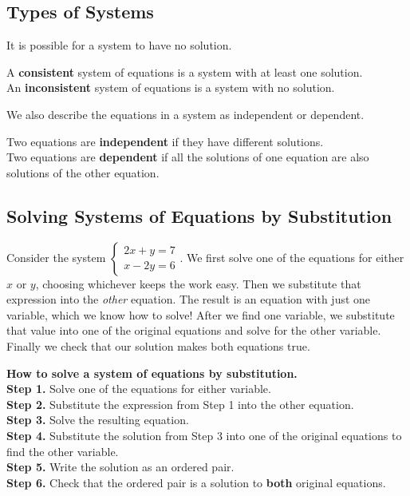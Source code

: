 \documentclass[letter]{article}
\newenvironment{keybox}
  {\begin{lrbox}{\keyboxsave}\begin{minipage}{\dimexpr\linewidth-2\fboxsep-2\fboxrule\relax}}
  {\end{minipage}\end{lrbox}\par\noindent\fbox{\usebox{\keyboxsave}}\par}
\begin{document}
\subsection{Types of Systems}

It is possible for a system to have no solution.

\begin{keybox}
A \textbf{consistent} system of equations is a system with at least one solution.\\
An \textbf{inconsistent} system of equations is a system with no solution.
\end{keybox}

We also describe the equations in a system as independent or dependent.

\begin{keybox}
Two equations are \textbf{independent} if they have different solutions.\\
Two equations are \textbf{dependent} if all the solutions of one equation are also solutions of the other equation.
\end{keybox}

\subsection{Solving Systems of Equations by Substitution}

Consider the system $\begin{cases}2x+y=7\\x-2y=6\end{cases}$. We first solve one of the equations for either $x$ or $y$, choosing whichever keeps the work easy. Then we substitute that expression into the \emph{other} equation. The result is an equation with just one variable, which we know how to solve! After we find one variable, we substitute that value into one of the original equations and solve for the other variable. Finally we check that our solution makes both equations true.

\begin{keybox}
\textbf{How to solve a system of equations by substitution.}\\
\textbf{Step 1.} Solve one of the equations for either variable.\\
\textbf{Step 2.} Substitute the expression from Step 1 into the other equation.\\
\textbf{Step 3.} Solve the resulting equation.\\
\textbf{Step 4.} Substitute the solution from Step 3 into one of the original equations to find the other variable.\\
\textbf{Step 5.} Write the solution as an ordered pair.\\
\textbf{Step 6.} Check that the ordered pair is a solution to \textbf{both} original equations.
\end{keybox}
\end{document}
